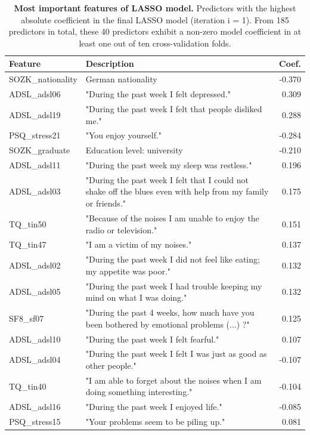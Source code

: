 \documentclass[
  oneside]{book}
\begin{document}
\begin{longtable}[t]{l>{\raggedright\arraybackslash}p{10cm}r}
\caption{\label{tab:08-lasso-depression-tab}\textbf{Most important features of LASSO model.} Predictors with the highest absolute coefficient in the final LASSO model (iteration i = 1). From 185 predictors in total, these 40 predictors exhibit a non-zero model coefficient in at least one out of ten cross-validation folds.}\\
\toprule
\textbf{Feature} & \textbf{Description} & \textbf{Coef.}\\
\midrule
SOZK\_nationality & German nationality & -0.370\\
ADSL\_adsl06 & "During the past week I felt depressed." & 0.309\\
ADSL\_adsl19 & "During the past week I felt that people disliked me." & 0.288\\
PSQ\_stress21 & "You enjoy yourself." & -0.284\\
SOZK\_graduate & Education level: university & -0.210\\
ADSL\_adsl11 & "During the past week my sleep was restless." & 0.196\\
ADSL\_adsl03 & "During the past week I felt that I could not shake off the blues even with help from my family or friends." & 0.175\\
TQ\_tin50 & "Because of the noises I am unable to enjoy the radio or television." & 0.151\\
TQ\_tin47 & "I am a victim of my noises." & 0.137\\
ADSL\_adsl02 & "During the past week I did not feel like eating; my appetite was poor." & 0.132\\
ADSL\_adsl05 & "During the past week I had trouble keeping my mind on what I was doing." & 0.132\\
SF8\_sf07 & "During the past 4 weeks, how much have you been bothered by emotional problems (...) ?" & 0.125\\
ADSL\_adsl10 & "During the past week I felt fearful." & 0.107\\
ADSL\_adsl04 & "During the past week I felt I was just as good as other people." & -0.107\\
TQ\_tin40 & "I am able to forget about the noises when I am doing something interesting." & -0.104\\
ADSL\_adsl16 & "During the past week I enjoyed life." & -0.085\\
PSQ\_stress15 & "Your problems seem to be piling up." & 0.081\\

\end{longtable}
\end{document}
